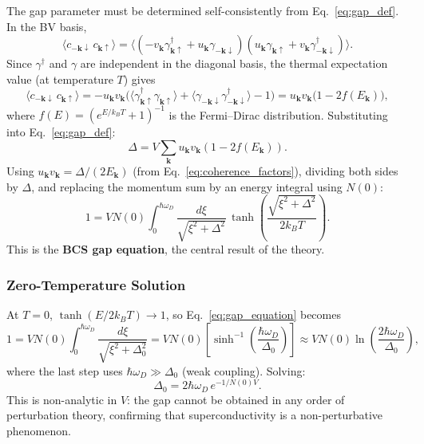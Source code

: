 The gap parameter must be determined self-consistently from
Eq.~\eqref{eq:gap_def}. In the BV basis,
\begin{equation}
	\langle c_{-\mathbf{k}\downarrow}\, c_{\mathbf{k}\uparrow}\rangle
	= \langle
	(-v_{\mathbf{k}} \gamma^\dagger_{\mathbf{k}\uparrow}
	+ u_{\mathbf{k}} \gamma_{-\mathbf{k}\downarrow})
	(u_{\mathbf{k}} \gamma_{\mathbf{k}\uparrow}
	+ v_{\mathbf{k}} \gamma^\dagger_{-\mathbf{k}\downarrow})
	\rangle.
\end{equation}
Since $\gamma^\dagger$ and $\gamma$ are independent in the diagonal basis,
the thermal expectation value (at temperature $T$) gives
\begin{equation}
	\langle c_{-\mathbf{k}\downarrow}\, c_{\mathbf{k}\uparrow}\rangle
	= -u_{\mathbf{k}} v_{\mathbf{k}}
	\bigl(\langle\gamma^\dagger_{\mathbf{k}\uparrow}\gamma_{\mathbf{k}\uparrow}\rangle
	+ \langle\gamma_{-\mathbf{k}\downarrow}\gamma^\dagger_{-\mathbf{k}\downarrow}\rangle
	- 1\bigr)
	= u_{\mathbf{k}} v_{\mathbf{k}}\bigl(1 - 2f(E_{\mathbf{k}})\bigr),
\end{equation}
where $f(E) = (e^{E/k_BT}+1)^{-1}$ is the Fermi--Dirac distribution.
Substituting into Eq.~\eqref{eq:gap_def}:
\begin{equation}
	\Delta = V\sum_{\mathbf{k}} u_{\mathbf{k}} v_{\mathbf{k}}
	(1 - 2f(E_{\mathbf{k}})).
\end{equation}
Using $u_{\mathbf{k}} v_{\mathbf{k}} = \Delta/(2E_{\mathbf{k}})$ (from
Eq.~\eqref{eq:coherence_factors}), dividing both sides by $\Delta$, and
replacing the momentum sum by an energy integral using $N(0)$:
\begin{equation}
	\boxed{1 = VN(0)\int_0^{\hbar\omega_D}
		\frac{d\xi}{\sqrt{\xi^2+\Delta^2}}\,
		\tanh\!\left(\frac{\sqrt{\xi^2+\Delta^2}}{2k_BT}\right).}
	\label{eq:gap_equation}
\end{equation}
This is the \textbf{BCS gap equation}, the central result of the theory.

\subsubsection{Zero-Temperature Solution}

At $T=0$, $\tanh(E/2k_BT) \to 1$, so Eq.~\eqref{eq:gap_equation} becomes
\begin{equation}
	1 = VN(0)\int_0^{\hbar\omega_D}
	\frac{d\xi}{\sqrt{\xi^2+\Delta_0^2}}
	= VN(0)\left[\sinh^{-1}\!\left(\frac{\hbar\omega_D}{\Delta_0}\right)\right]
	\approx VN(0)\ln\!\left(\frac{2\hbar\omega_D}{\Delta_0}\right),
\end{equation}
where the last step uses $\hbar\omega_D \gg \Delta_0$ (weak coupling). Solving:
\begin{equation}
	\boxed{\Delta_0 = 2\hbar\omega_D\, e^{-1/N(0)V}.}
	\label{eq:Delta_0}
\end{equation}
This is non-analytic in $V$: the gap cannot be obtained in any order of
perturbation theory, confirming that superconductivity is a non-perturbative
phenomenon.

